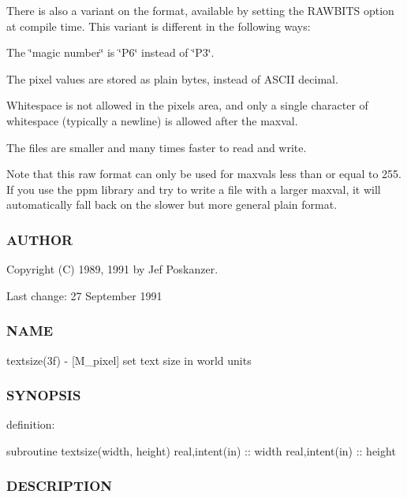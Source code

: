 There is also a variant on the format, available by setting the R\+A\+W\+B\+I\+TS option at compile time. This variant is different in the following ways\+:


\begin{DoxyItemize}
\item The \char`\"{}magic number\char`\"{} is \char`\"{}\+P6\char`\"{} instead of \char`\"{}\+P3\char`\"{}.
\item The pixel values are stored as plain bytes, instead of A\+S\+C\+II decimal.
\item Whitespace is not allowed in the pixels area, and only a single character of whitespace (typically a newline) is allowed after the maxval.
\item The files are smaller and many times faster to read and write.
\end{DoxyItemize}

Note that this raw format can only be used for maxvals less than or equal to 255. If you use the ppm library and try to write a file with a larger maxval, it will automatically fall back on the slower but more general plain format.

\subsubsection*{A\+U\+T\+H\+OR}

Copyright (C) 1989, 1991 by Jef Poskanzer. \begin{DoxyVerb}        Last change: 27 September 1991 \end{DoxyVerb}


\subsubsection*{N\+A\+ME}

textsize(3f) -\/ \mbox{[}M\+\_\+pixel\mbox{]} set text size in world units

\subsubsection*{S\+Y\+N\+O\+P\+S\+IS}

definition\+:

subroutine textsize(width, height) real,intent(in) \+:\+: width real,intent(in) \+:\+: height

\subsubsection*{D\+E\+S\+C\+R\+I\+P\+T\+I\+ON}

